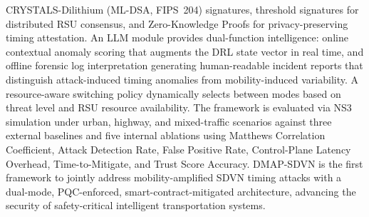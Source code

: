 CRYSTALS-Dilithium (ML-DSA, FIPS~204) signatures, threshold
signatures for distributed RSU consensus, and Zero-Knowledge Proofs
for privacy-preserving timing attestation. An LLM module provides dual-function intelligence: online contextual anomaly scoring that augments the DRL state vector in real time, and offline forensic log interpretation generating human-readable incident reports that distinguish attack-induced timing anomalies from
mobility-induced variability. A resource-aware switching policy dynamically
selects between modes based on threat level and RSU resource
availability. The framework is evaluated via NS3 simulation under
urban, highway, and mixed-traffic scenarios against three external
baselines and five internal ablations using Matthews Correlation
Coefficient, Attack Detection Rate, False Positive Rate,
Control-Plane Latency Overhead, Time-to-Mitigate, and Trust Score
Accuracy. DMAP-SDVN is the first framework to jointly address
mobility-amplified SDVN timing attacks with a dual-mode,
PQC-enforced, smart-contract-mitigated architecture, advancing
the security of safety-critical intelligent transportation systems.


\thispagestyle{plain}
\newpage